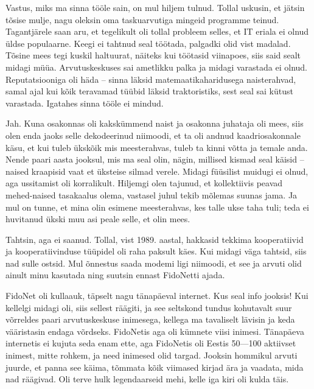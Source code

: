 Vastus, miks ma sinna tööle sain, on mul hiljem 
tulnud. Tollal uskusin, et jätsin tõsise mulje, nagu oleksin oma 
taskuarvutiga mingeid programme teinud. Tagantjärele saan aru, et tegelikult oli tollal probleem selles, et IT eriala ei olnud üldse 
populaarne. Keegi ei tahtnud seal töötada, palgadki olid vist madalad. Tõsine 
mees tegi kuskil haltuurat, näiteks kui töötasid viinapoes, siis said 
sealt midagi müüa. Arvutuskeskuses sai ametlikku 
palka ja midagi varastada ei olnud. Reputatsiooniga oli häda -- sinna läksid 
matemaatikaharidusega naisterahvad, samal ajal kui kõik teravamad 
tüübid läksid traktoristiks, sest seal sai kütust varastada. 
Igatahes sinna tööle ei mindud. 


Jah. Kuna osakonnas oli kakskümmend naist ja osakonna 
juhataja oli mees, siis olen enda jaoks selle dekodeerinud niimoodi, 
et ta oli andnud kaadriosakonnale käsu, et kui tuleb ükskõik mis meesterahvas, 
tuleb ta kinni võtta ja temale anda. Nende paari aasta jooksul, mis 
ma seal olin, nägin, millised kismad seal käisid -- naised kraapisid vaat et
üksteise silmad verele. Midagi füüsilist muidugi ei olnud, aga ussitamist oli 
korralikult. Hiljemgi olen tajunud, et kollektiivis peavad 
mehed-naised tasakaalus olema, vastasel juhul tekib mõlemas suunas
jama. Ja mul on tunne, et mina olin esimene meesterahvas, kes talle ukse taha 
tuli; teda ei huvitanud ükski muu asi peale selle, et olin mees. 


Tahtsin, aga ei saanud. Tollal, vist 1989. aastal, hakkasid tekkima
kooperatiivid ja kooperatiivinduse tüüpidel oli raha 
paksult käes. Kui midagi väga tahtsid, siis nad sulle ostsid. Mul 
õnnestus saada modemi ligi niimoodi, et see ja arvuti olid ainult minu kasutada ning suutsin ennast FidoNetti ajada.

FidoNet oli 
kullaauk, täpselt nagu tänapäeval internet. Kus seal info jooksis! 
Kui kellelgi midagi oli, siis sellest räägiti, ja see seltskond tundus 
kohutavalt suur võrreldes paari arvutuskeskuse inimesega, kellega ma 
tavaliselt lävisin ja keda vääristasin endaga võrdseks. FidoNetis aga oli 
kümnete viisi inimesi. Tänapäeva internetis ei kujuta seda enam ette, aga FidoNetis oli Eestis 
50---100 aktiivset inimest, mitte rohkem, ja need inimesed 
olid targad. Jooksin hommikul arvuti juurde, et panna see käima, tõmmata 
kõik viimased kirjad ära ja vaadata, mida nad räägivad. Oli terve hulk 
legendaarseid mehi, kelle iga kiri oli kulda täis.

